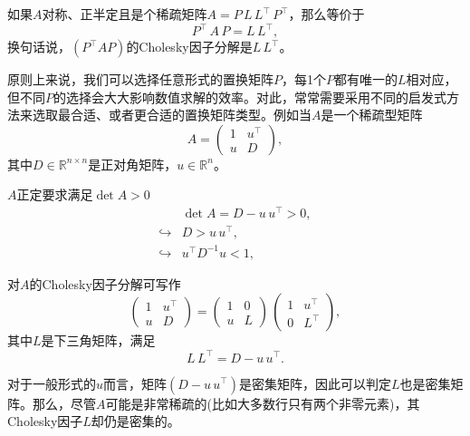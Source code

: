 如果$A$对称、正半定且是个稀疏矩阵$A = P \, L \, L^{\top} \, P^{\top}$，那么等价于
\begin{equation*}
  P^{\top} \, A \, P = L \, L^{\top},
\end{equation*}
换句话说，$\left( P^{\top} A P \right)$的Cholesky因子分解是$L \, L^{\top}$。

原则上来说，我们可以选择任意形式的置换矩阵$P$，每1个$P$都有唯一的$L$相对应，但不同$P$的选择会大大影响数值求解的效率。对此，常常需要采用不同的启发式方法来选取最合适、或者更合适的置换矩阵类型。例如当$A$是一个稀疏型矩阵
\begin{equation*}
  A = \begin{pmatrix}
  1 & u^{\top} \\ u & D
  \end{pmatrix},
\end{equation*}
其中$D \in \mathbb{R}^{n \times n}$是正对角矩阵，$u \in \mathbb{R}^{n}$。

$A$正定要求满足$\det A >0$
\begin{equation*}
  \begin{split}
    & \det A = D - u \, u^{\top} > 0, \\
    \hookrightarrow & D > u \, u^{\top}, \\
    \hookrightarrow & u^{\top} D^{-1} u < 1,
  \end{split}
\end{equation*}

对$A$的Cholesky因子分解可写作
\begin{equation}
  \label{eq:umlin-factorization-cholesky-a}
  \begin{pmatrix}
    1 & u^{\top} \\ u &  D
  \end{pmatrix}
  = \begin{pmatrix}
  1 & 0 \\ u & L
  \end{pmatrix}
  \, \begin{pmatrix}
  1 & u^{\top} \\ 0 & L^{\top}
  \end{pmatrix},
\end{equation}
其中$L$是下三角矩阵，满足
\begin{equation*}
  L \, L^{\top} = D - u \, u^{\top}.
\end{equation*}

对于一般形式的$u$而言，矩阵$\left( D - u \, u^{\top} \right)$是密集矩阵，因此可以判定$L$也是密集矩阵。那么，尽管$A$可能是非常稀疏的(比如大多数行只有两个非零元素)，其Cholesky因子$L$却仍是密集的。

